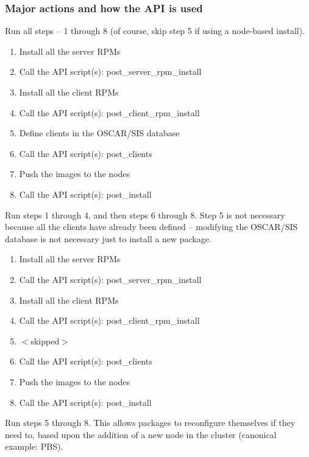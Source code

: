 \subsubsection{Major actions and how the API is used}


Run all steps -- 1 through 8 (of course, skip step 5 if using a
node-based install).

\begin{enumerate}
\item Install all the server RPMs
\item Call the API script(s): post\_server\_rpm\_install
\item Install all the client RPMs
\item Call the API script(s): post\_client\_rpm\_install
\item Define clients in the OSCAR/SIS database
\item Call the API script(s): post\_clients
\item Push the images to the nodes
\item Call the API script(s): post\_install
\end{enumerate}


Run steps 1 through 4, and then steps 6 through 8.  Step 5 is not
necessary because all the clients have already been defined --
modifying the OSCAR/SIS database is not necessary just to install a
new package.

\begin{enumerate}
\item Install all the server RPMs
\item Call the API script(s): post\_server\_rpm\_install
\item Install all the client RPMs
\item Call the API script(s): post\_client\_rpm\_install
\item $<$skipped$>$
\item Call the API script(s): post\_clients
\item Push the images to the nodes
\item Call the API script(s): post\_install
\end{enumerate}


Run steps 5 through 8.  This allows packages to reconfigure themselves
if they need to, based upon the addition of a new node in the cluster
(canonical example: PBS).

